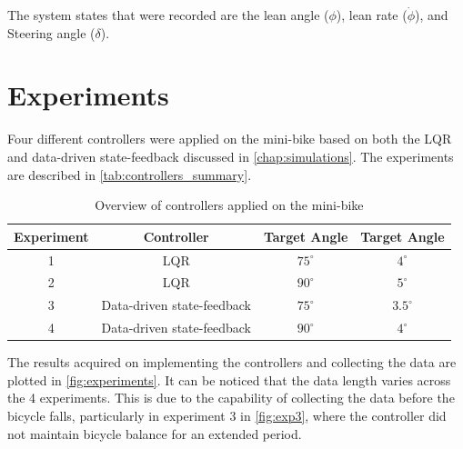 The system states that were recorded are the lean angle ($\phi$), lean rate ($\dot{\phi}$), and Steering angle ($\delta$).

\section{Experiments}
Four different controllers were applied on the mini-bike based on both the LQR and data-driven state-feedback discussed in \autoref{chap:simulations}. The experiments are described in \autoref{tab:controllers_summary}.

\begin{table}[H]
	\centering
	\caption{Overview of controllers applied on the mini-bike}
	\label{tab:controllers_summary}
	\begin{tabular}{|c|c|c|c|}
		\hline
		\textbf{Experiment} & \textbf{Controller} & \textbf{Target Angle}  & \textbf{Target Angle} \\ \hline
		1 & LQR & $75^\circ$  & $4^\circ$ \\ \hline
		2 & LQR & $90^\circ$  &  $5^\circ$ \\ \hline
		3 & Data-driven state-feedback & $75^\circ$  &  $3.5^\circ$ \\ \hline
		4 & Data-driven state-feedback & $90^\circ$  &  $4^\circ$ \\ \hline
	\end{tabular}
\end{table}

The results acquired on implementing the controllers and collecting the data are plotted in \autoref{fig:experiments}. It can be noticed that the data length varies across the 4 experiments. This is due to the capability of collecting the data before the bicycle falls, particularly in experiment 3 in \autoref{fig:exp3}, where the controller did not maintain bicycle balance for an extended period.

